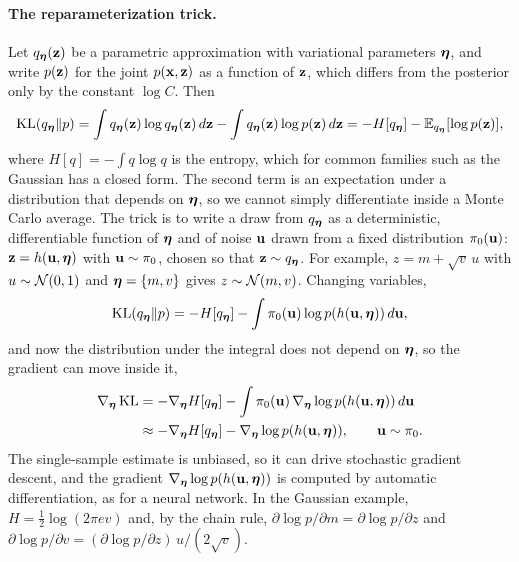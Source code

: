 \paragraph{The reparameterization trick.} Let $q_{\boldsymbol{\eta}}(\mathbf{z})$ be a parametric approximation with variational parameters $\boldsymbol{\eta}$, and write $p(\mathbf{z})$ for the joint $p(\mathbf{x},\mathbf{z})$ as a function of $\mathbf{z}$, which differs from the posterior only by the constant $\log C$. Then
\begin{equation}
  \operatorname{KL}(q_{\boldsymbol{\eta}}\|p) = \int q_{\boldsymbol{\eta}}(\mathbf{z})\log q_{\boldsymbol{\eta}}(\mathbf{z})\,d\mathbf{z} - \int q_{\boldsymbol{\eta}}(\mathbf{z})\log p(\mathbf{z})\,d\mathbf{z} = -H[q_{\boldsymbol{\eta}}] - \mathbb{E}_{q_{\boldsymbol{\eta}}}[\log p(\mathbf{z})],
\end{equation}
where $H[q]=-\int q\log q$ is the entropy, which for common families such as the Gaussian has a closed form. The second term is an expectation under a distribution that depends on $\boldsymbol{\eta}$, so we cannot simply differentiate inside a Monte Carlo average. The trick is to write a draw from $q_{\boldsymbol{\eta}}$ as a deterministic, differentiable function of $\boldsymbol{\eta}$ and of noise $\mathbf{u}$ drawn from a fixed distribution $\pi_0(\mathbf{u})$: $\mathbf{z}=h(\mathbf{u},\boldsymbol{\eta})$ with $\mathbf{u}\sim\pi_0$, chosen so that $\mathbf{z}\sim q_{\boldsymbol{\eta}}$. For example, $z=m+\sqrt{v}\,u$ with $u\sim\mathcal{N}(0,1)$ and $\boldsymbol{\eta}=\{m,v\}$ gives $z\sim\mathcal{N}(m,v)$. Changing variables,
\begin{equation}
  \operatorname{KL}(q_{\boldsymbol{\eta}}\|p) = -H[q_{\boldsymbol{\eta}}] - \int\pi_0(\mathbf{u})\log p(h(\mathbf{u},\boldsymbol{\eta}))\,d\mathbf{u} ,
\end{equation}
and now the distribution under the integral does not depend on $\boldsymbol{\eta}$, so the gradient can move inside it,
\begin{align}
  \nabla_{\boldsymbol{\eta}}\operatorname{KL} &= -\nabla_{\boldsymbol{\eta}}H[q_{\boldsymbol{\eta}}] - \int\pi_0(\mathbf{u})\,\nabla_{\boldsymbol{\eta}}\log p(h(\mathbf{u},\boldsymbol{\eta}))\,d\mathbf{u} \nonumber\\
  &\approx -\nabla_{\boldsymbol{\eta}}H[q_{\boldsymbol{\eta}}] - \nabla_{\boldsymbol{\eta}}\log p(h(\mathbf{u},\boldsymbol{\eta})), \qquad \mathbf{u}\sim\pi_0 .
\end{align}
The single-sample estimate is unbiased, so it can drive stochastic gradient descent, and the gradient $\nabla_{\boldsymbol{\eta}}\log p(h(\mathbf{u},\boldsymbol{\eta}))$ is computed by automatic differentiation, as for a neural network. In the Gaussian example, $H=\frac12\log(2\pi e v)$ and, by the chain rule, $\partial\log p/\partial m=\partial\log p/\partial z$ and $\partial\log p/\partial v=(\partial\log p/\partial z)\,u/(2\sqrt v)$.

